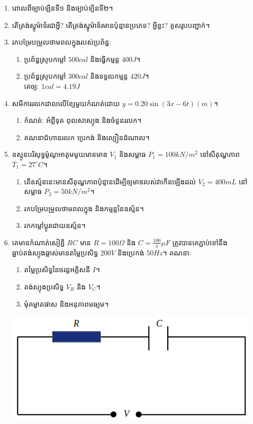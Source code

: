 \documentclass{officialexam}
\begin{document}
\begin{enumerate}[I]
	\item ពោលពីច្បាប់ឡិនទី១ និងច្បាប់ទ្បិនទី២។
	\item តើត្រង់ស្វូម៉ាទ័រជាអ្វី? តើត្រង់ស្វូម៉ាទ័រមានប៉ុន្មានប្រភេទ? អ្វីខ្លះ? គូសរូបបញ្ជាក់។
	\item រកបម្រែបម្រួលថាមពលក្នុងរបស់ប្រព័ន្ធៈ
	\begin{enumerate}[k,2]
		\item ប្រព័ន្ធស្រូបកម្តៅ $500cal$ និងធ្វើកម្មន្ត $400J$។
		\item ប្រព័ន្ធស្រូបកម្តៅ $300cal$ និងទទួលកម្មន្ត $420J$។\\ គេឲ្យៈ $1cal=4.19J$
	\end{enumerate}
	\item សមីការរលកដាលលើខ្សែមួយកំណត់ដោយ $y=0.20\sin\left(3x-6t\right)\left(m\right)$។
	\begin{enumerate}[k,2]
		\item កំណត់ៈ អំព្លីទុត ពុលសាស្យុង និងចំនួនរលក។
		\item គណនាជំហានរលក ប្រេកង់ និងល្បឿនដំណាល។
	\end{enumerate}
	\item ឧស្មូនបរិសុទ្ធម៉ូណូអាតូមមួយមានមាឌ $V_{1}$ និងសម្ពាធ $P_{1}=100kN/m^{2}$ នៅសីតុណ្ហភាព $T_{1}=27^\circ C$។
	\begin{enumerate}[k]
		\item តើឧស្ម័ននេះមានសីតុណ្ហភាពប៉ុន្មានដើម្បីឲ្យមាឌរបស់វាកើនឡើងដល់ $V_{2}=400mL$ នៅសម្ពាធ $P_{2}=50kN/m^{2}$។
		\item រកបម្រែបម្រួលថាមពលក្នុង និងកម្មន្តនៃឧស្ម័ន។
		\item រកកម្តៅប្តូរដោយឧស្ម័ន។
	\end{enumerate} 
	\item គេមានកំណាត់សៀគ្វី $RC$ មាន $R=100\Omega$ និង $C=\frac{100}{\pi}\mu F$ ត្រូវបានគេភ្ជាប់ទៅនឹងឆ្នាប់តង់ស្យុងឆ្លាស់មានតម្លៃប្រសិទ្ធ $200V$ និងប្រេកង់ $50Hz$។ គណនាៈ
	\begin{multicols}{2}
		\begin{enumerate}[k]
			\item តម្លៃប្រសិទ្ធនៃចរន្តអគ្គិសនី $I$។
			\item តង់ស្យុងប្រសិទ្ធ $V_{R}$ និង $V_{C}$។
			\item មុំគម្លាតផាស និងអនុភាពមធ្យម។
		\end{enumerate}
		\includegraphics[scale=0.4]{image6}

\end{multicols}
\end{enumerate}
\end{document}
